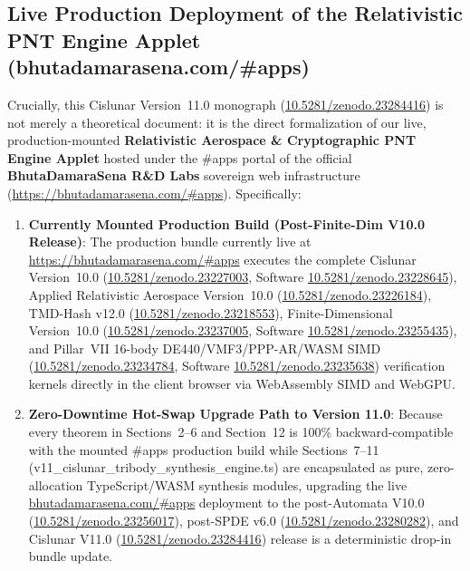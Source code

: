 \documentclass[11pt,a4paper,reqno]{article}
\def\texttt#1{#1}%
\newcommand{\zenodo}[1]{\href{https://doi.org/10.5281/zenodo.#1}{\texttt{10.5281/\allowbreak zenodo.#1}}}
\newcommand{\appsportal}{\href{https://bhutadamarasena.com/\#apps}{\texttt{https://bhutadamarasena.com/\#apps}}}
\newcommand{\appsportalshort}{\href{https://bhutadamarasena.com/\#apps}{\texttt{bhutadamarasena.com/\#apps}}}
\theoremstyle{plain}
\theoremstyle{definition}
\theoremstyle{remark}
\numberwithin{equation}{section}
\begin{document}
\subsection{\texorpdfstring{Live Production Deployment of the Relativistic PNT Engine Applet (\texttt{bhutadamarasena.com/\#apps})}{Live Production Deployment of the Relativistic PNT Engine Applet (bhutadamarasena.com/apps)}}
\label{subsec:live_pnt_applet_deployment}
Crucially, this Cislunar Version~11.0 monograph (\zenodo{23284416}) is not merely a theoretical document: it is the direct formalization of our live, production-mounted \textbf{Relativistic Aerospace \& Cryptographic PNT Engine Applet} hosted under the \texttt{\#apps} portal of the official \textbf{BhutaDamaraSena R\&D Labs} sovereign web infrastructure (\appsportal). Specifically:
\begin{enumerate}[leftmargin=1.8em,itemsep=2pt]
  \item \textbf{Currently Mounted Production Build (Post-Finite-Dim V10.0 Release)}: The production bundle currently live at \appsportal{} executes the complete Cislunar Version~10.0 (\zenodo{23227003}, Software \zenodo{23228645}), Applied Relativistic Aerospace Version~10.0 (\zenodo{23226184}), TMD-Hash v12.0 (\zenodo{23218553}), Finite-Dimensional Version~10.0 (\zenodo{23237005}, Software \zenodo{23255435}), and Pillar~VII 16-body DE440/VMF3/PPP-AR/WASM SIMD (\zenodo{23234784}, Software \zenodo{23235638}) verification kernels directly in the client browser via WebAssembly SIMD and WebGPU.
  \item \textbf{Zero-Downtime Hot-Swap Upgrade Path to Version 11.0}: Because every theorem in Sections~2--6 and Section~12 is 100\% backward-compatible with the mounted \texttt{\#apps} production build while Sections~7--11 (\texttt{v11\_cislunar\_tribody\_synthesis\_engine.ts}) are encapsulated as pure, zero-allocation TypeScript/WASM synthesis modules, upgrading the live \appsportalshort{} deployment to the post-Automata V10.0 (\zenodo{23256017}), post-SPDE v6.0 (\zenodo{23280282}), and Cislunar V11.0 (\zenodo{23284416}) release is a deterministic drop-in bundle update.
\end{enumerate}
\end{document}
